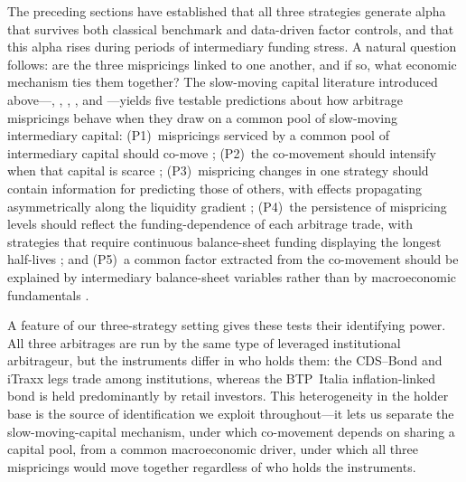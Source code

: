 


The preceding sections have established that all three strategies
generate alpha that survives both classical benchmark and data-driven
factor controls, and that this alpha rises during periods of
intermediary funding stress. A natural question follows: are the
three mispricings linked to one another, and if so, what economic
mechanism ties them together? The slow-moving capital literature
introduced above---\citet{duffie2010presidential},
\citet{brunnermeier2009market}, \citet{mitchell2012arbitrage},
\citet{boyarchenko2016trends}, and \citet{fleckenstein2014tips}---yields
five testable predictions about how arbitrage mispricings behave when they
draw on a common pool of slow-moving intermediary capital:
(P1)~mispricings serviced by a common pool of intermediary capital
should co-move \citep{duffie2010presidential}; (P2)~the co-movement
should intensify when that capital is scarce
\citep{duffie2010presidential, brunnermeier2009market};
(P3)~mispricing changes in one strategy should contain information for
predicting those of others, with effects propagating asymmetrically
along the liquidity gradient \citep{mitchell2012arbitrage, fleckenstein2014tips};
(P4)~the persistence of mispricing levels should reflect the
funding-dependence of each arbitrage trade, with strategies that
require continuous balance-sheet funding displaying the longest
half-lives \citep{boyarchenko2016trends}; and (P5)~a common factor
extracted from the co-movement should be explained by intermediary
balance-sheet variables rather than by macroeconomic fundamentals
\citep{duffie2010presidential, brunnermeier2009market}.

A feature of our three-strategy setting gives these tests their
identifying power. All three arbitrages are run by the same type of
leveraged institutional arbitrageur, but the instruments differ in who
holds them: the CDS--Bond and iTraxx legs trade among institutions,
whereas the BTP~Italia inflation-linked bond is held predominantly by
retail investors. This heterogeneity in the holder base is the source
of identification we exploit throughout---it lets us separate the
slow-moving-capital mechanism, under which co-movement depends on
sharing a capital pool, from a common macroeconomic driver, under which
all three mispricings would move together regardless of who holds the
instruments.

